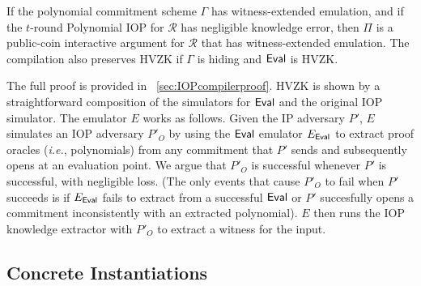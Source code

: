 \newcommand{\theoremIOPcompiler}{If the polynomial commitment scheme $\Gamma$ has witness-extended emulation, and if the $t$-round Polynomial IOP for $\mathcal{R}$ has negligible knowledge error, then $\Pi$ is a public-coin interactive argument for $\mathcal{R}$ that has witness-extended emulation. The compilation also preserves HVZK if $\Gamma$ is hiding and $\eval$ is HVZK.}
\begin{theorem}\label{thm:IOPcompiler}
\theoremIOPcompiler
\end{theorem}

The full proof is provided in \appendixphrase~\ref{sec:IOPcompilerproof}. 
HVZK is shown by a straightforward composition of the simulators for $\textsf{{Eval}}$ and the original IOP simulator. The emulator $E$ works as follows. Given the IP adversary $P'$, $E$ simulates an IOP adversary $P'_O$ by using the $\textsf{{Eval}}$ emulator $E_\textsf{{Eval}}$ to extract proof oracles (\emph{i.e.}, polynomials) from any commitment that $P'$ sends and subsequently opens at an evaluation point. We argue that $P'_O$ is successful whenever $P'$ is successful, with negligible loss. (The only events that cause $P'_O$ to fail when $P'$ succeeds is if $E_\textsf{{Eval}}$ fails to extract from a successful $\textsf{{Eval}}$ or $P'$ succesfully opens a commitment inconsistently with an extracted polynomial). $E$ then runs the IOP knowledge extractor with $P'_O$ to extract a witness for the input. 


\subsection{Concrete Instantiations} 

